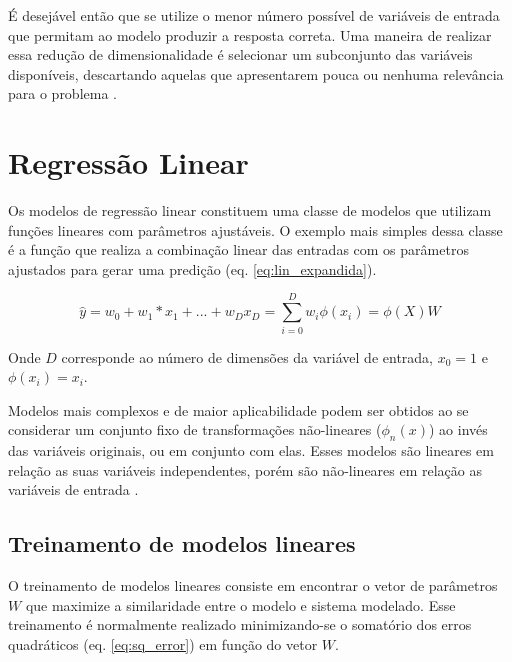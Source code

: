 É desejável então que se utilize o menor número possível de variáveis de entrada que permitam ao modelo produzir a resposta correta. Uma maneira de realizar essa redução de dimensionalidade é selecionar um subconjunto das variáveis disponíveis, descartando aquelas que apresentarem pouca ou nenhuma relevância para o problema \cite[p. 204]{intro_stat_learn}.


\section{Regressão Linear}

Os modelos de regressão linear constituem uma classe de modelos que utilizam funções lineares com parâmetros ajustáveis. O exemplo mais simples dessa classe é a função que realiza a combinação linear das entradas com os parâmetros ajustados para gerar uma predição (eq. \ref{eq:lin_expandida}).

\begin{equation}
    \hat{y} = w_0 + w_1*x_1+ ... + w_Dx_D = \sum_{i = 0}^{D} w_i\phi(x_i) = \phi(X)W
    \label{eq:lin_expandida}
\end{equation}

Onde $D$ corresponde ao número de dimensões da variável de entrada, $x_0 = 1$ e $\phi(x_i) = x_i$.

Modelos mais complexos e de maior aplicabilidade podem ser obtidos ao se considerar um conjunto fixo de transformações não-lineares ($\phi_n(x)$) ao invés das variáveis originais, ou em conjunto com elas. Esses modelos são lineares em relação as suas variáveis independentes, porém são não-lineares em relação as variáveis de entrada \cite{bishop_2006}.

\subsection{Treinamento de modelos lineares}

O treinamento de modelos lineares consiste em encontrar o vetor de parâmetros $W$ que maximize a similaridade entre o modelo e sistema modelado. Esse treinamento é normalmente realizado minimizando-se o somatório dos erros quadráticos (eq. \ref{eq:sq_error}) em função do vetor $W$.


